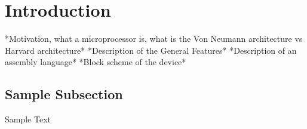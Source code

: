 \section{Introduction} \label{sec:intro}
*Motivation, what a microprocessor is, what is the Von Neumann architecture vs Harvard architecture*
*Description of the General Features*
*Description of an assembly language*
*Block scheme of the device*
\subsection{Sample Subsection}  \label{ssec:laser_technology}
Sample Text \cite{OurWork}